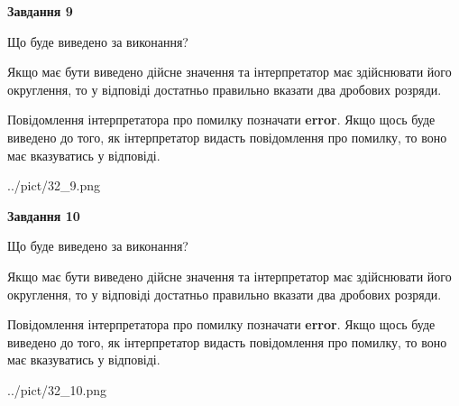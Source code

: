 \documentclass[12pt, ukrainian]{article}
\begin{document}
{\begin {Large}
{\begin {center}\textbf{Завдання 9}\end {center}}\par
Що буде виведено за виконання? \par

Якщо має бути виведено дійсне значення та інтерпретатор має здійснювати його округлення, 
то у відповіді достатньо правильно вказати два дробових розряди.

Повідомлення інтерпретатора про помилку позначати \textbf{error}.
Якщо щось буде виведено до того, як інтерпретатор видасть повідомлення про помилку, 
то воно має вказуватись у відповіді. \par

\begin{center}
	{../pict/32_9.png}
\end{center}
\newpage

{\begin {center}\textbf{Завдання 10}\end {center}}\par
Що буде виведено за виконання? \par

Якщо має бути виведено дійсне значення та інтерпретатор має здійснювати його округлення, 
то у відповіді достатньо правильно вказати два дробових розряди.

Повідомлення інтерпретатора про помилку позначати \textbf{error}.
Якщо щось буде виведено до того, як інтерпретатор видасть повідомлення про помилку, 
то воно має вказуватись у відповіді. \par

\begin{center}
	{../pict/32_10.png}
\end{center}
\newpage

\end {Large}}
\end{document}
